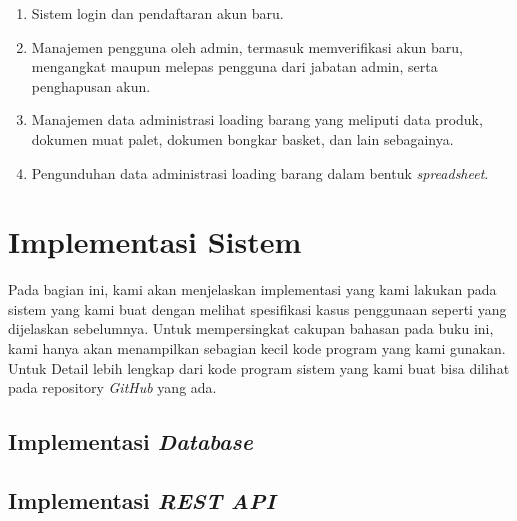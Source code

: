 \begin{enumerate}[nolistsep]

  \item Sistem login dan pendaftaran akun baru.
  \vspace{0.5ex}

  \item Manajemen pengguna oleh admin, termasuk memverifikasi akun baru, mengangkat maupun melepas pengguna dari jabatan admin, serta penghapusan akun.
  \vspace{0.5ex}

  \item Manajemen data administrasi loading barang yang meliputi data produk, dokumen muat palet, dokumen bongkar basket, dan lain sebagainya.
  \vspace{0.5ex}

  \item Pengunduhan data administrasi loading barang dalam bentuk \emph{spreadsheet}.
  \vspace{0.5ex}

\end{enumerate}
\vspace{0.5ex}

\section{Implementasi Sistem}
\vspace{1ex}

Pada bagian ini, kami akan menjelaskan implementasi yang kami lakukan pada sistem yang kami buat dengan melihat spesifikasi kasus penggunaan seperti yang dijelaskan sebelumnya.
Untuk mempersingkat cakupan bahasan pada buku ini, kami hanya akan menampilkan sebagian kecil kode program yang kami gunakan.
Untuk Detail lebih lengkap dari kode program sistem yang kami buat bisa dilihat pada repository \emph{GitHub} \citep{repoGithub} yang ada.

\subsection{Implementasi \emph{Database}}
\vspace{1ex}

\lipsum[3]
\vspace{0.5ex}

\subsection{Implementasi \emph{REST API}}
\vspace{1ex}

